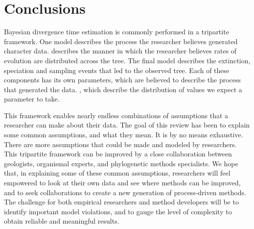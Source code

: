 \section{Conclusions}

Bayesian divergence time estimation is commonly performed in a tripartite framework.
One model describes the process the researcher believes generated  character data.
 describes the manner in which the researcher believes rates of evolution are distributed across the tree.
The final model describes the extinction, speciation and sampling events that  led to the observed tree.
Each of these components has its own parameters, which are believed to describe the process that generated the data.
, which describe the distribution of values we expect a parameter to take.

This framework enables nearly endless combinations of assumptions that a researcher can make about their data.
The goal of this review has been to explain some common assumptions, and what they mean. 
It is by no means exhaustive.
There are more assumptions that could be made and modeled by researchers.
This tripartite framework can be improved by a close collaboration between geologists, organismal experts, and phylogenetic methods specialists. 
We hope that, in explaining some of these common assumptions, researchers will feel empowered to look at their own data and see where methods can be improved, and to seek collaborations to create a new generation of process-driven methods. The challenge for both empirical researchers and method developers will be to identify important model violations, and to gauge the level of complexity  to obtain reliable and meaningful results.

